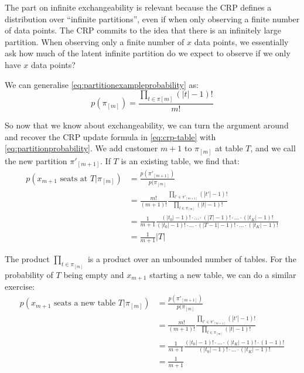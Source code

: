 The part on infinite exchangeability is relevant because the CRP defines a distribution over ``infinite partitions'', even if when only observing a finite number of data points. The CRP commits to the idea that there is an infinitely large partition. When observing only a finite number of $x$ data points, we essentially ask how much of the latent infinite partition do we expect to observe if we only have $x$ data points?

We can generalise \cref{eq:partitionexampleprobability} as:
\begin{equation}\label{eq:partitionprobability}
	p(\pi_{[m]}) = \frac{\prod_{t\in\pi{[m]}} (|t|-1)!}{m!}
\end{equation}

So now that we know about exchangeability, we can turn the argument around and recover the CRP update formula in \cref{eq:crp-table} with \cref{eq:partitionprobability}. We add customer $m+1$ to $\pi_{[m]}$ at table $T$, and we call the new partition $\pi'_{[m+1]}$. If $T$ is an existing table, we find that:
\begin{equation}
\begin{split}
	p(x_{m+1}\text{ seats at }T|\pi_{[m]}) &= \frac{p(\pi'_{[m+1]})}{p(\pi_{[m]}} \\
     &= \frac{m!}{(m+1)!}\frac{\prod_{t'\in\pi'_{[m+1]}}(|t'|-1)!}{\prod_{t\in\pi_{[m]}}(|t|-1)!} \\
     &= \frac{1}{m+1}\frac{(|t_0|-1)! \cdot \ldots \cdot (|T|-1)! \cdot\ldots\cdot (|t_K|-1)!}{(|t_0|-1)! \cdot \ldots \cdot (|T-1|-1)! \cdot\ldots\cdot (|t_K|-1)!} \\
     &= \frac{1}{m+1}|T|
\end{split}
\end{equation}

The product $\prod_{t\in\pi_{[m]}}$ is a product over an unbounded number of tables. For the probability of $T$ being empty and $x_{m+1}$ starting a new table, we can do a similar exercise:
\begin{equation}
\begin{split}
	p(x_{m+1}\text{ seats a new table }T|\pi_{[m]}) &= \frac{p(\pi'_{[m+1]})}{p(\pi_{[m]}} \\
    &= \frac{m!}{(m+1)!}\frac{\prod_{t'\in\pi'_{[m+1]}}(|t'|-1)!}{\prod_{t\in\pi_{[m]}}(|t|-1)!} \\
    &= \frac{1}{m+1}\frac{(|t_0|-1)! \cdot\ldots\cdot (|t_K|-1)! \cdot (1-1)!}{(|t_0|-1)! \cdot\ldots\cdot (|t_K|-1)!} \\
	&= \frac{1}{m+1}
\end{split}
\end{equation}

